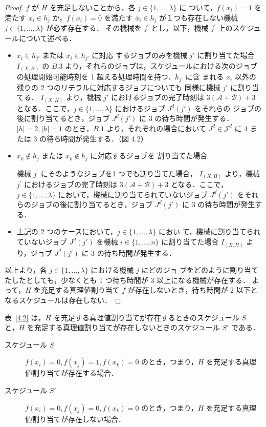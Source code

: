 \documentclass[12pt]{optlab-bachelor}
\begin{document}
\begin{proof}
  $f$ が $H$ を充足しないことから，各 $j \in \{1, \ldots, \lambda \}$ に
  ついて，$f(x_i) = 1$ を満たす $x_i \in h_j$ か，$f(x_i) = 0$ を満たす
  $\bar x_i \in h_j$ が１つも存在しない機械 $j \in \{1,\ldots, \lambda\}$ が必ず存在する．
  その機械を $j^{\prime}$ とし，以下，機械 $j^{\prime}$ 上のスケジュールについて述べる．
  \begin{itemize}
    \item $x_i \in h_{j'}$ または $\bar x_i \in h_{j'}$ に対応
    するジョブのみを機械 $j'$ に割り当てた場合
    $I_{(X,H)}$ の $B.3$ より，それらのジョブは，スケジュールにおける次のジョブの処理開始可能時刻を 1 超える処理時間を持つ．$h_{j'}$ に含
    まれる $x_i$ 以外の残りの 2 つのリテラルに対応するジョブについても
    同様に機械 $j'$ に割り当てる．
    $I_{(X,H)}$ より，機械 $j'$ におけるジョブの完了時刻は
    $3(\mathcal{A} + \mathcal{B}) + 3$ となる．ここで，$j \in
    \{1,\ldots,\lambda\}$ におけるジョブ $J^d(j')$ をそれらの
    ジョブの後に割り当てるとき，ジョブ $J^d(j')$ に 3 の待ち時間が発生する．$|h| = 2,|h| = 1$ のとき，$B.1$ より，それぞれの場合において $J^d \in \mathcal{J}^d$ に 4 または 3 の待ち時間が発生する．（図 4.2）
  \end{itemize}

  \begin{itemize}
    \item $x_k \notin h_j$ または $\bar x_k \notin h_j$ に対応するジョブを
    割り当てた場合

    機械 $j^{\prime}$ にそのようなジョブを1 つでも割り当てた場合，
    $I_{(X,H)}$ より，機械 $j^{\prime}$ におけるジョブの完了時刻は
    $3(\mathcal{A} + \mathcal{B}) + 3$ となる．ここで，$j \in
    \{1,\ldots,\lambda\}$ において，機械に割り当てられていないジョブ
    $J^d(j')$ をそれらのジョブの後に割り当てるとき，ジョブ
    $J^d(j')$ に 3 の待ち時間が発生する．
    \item 上記の 2 つのケースにおいて，$j \in \{1,\ldots,\lambda\}$ におい
    て，機械に割り当てられていないジョブ $J^d(j')$ を機械 $i
    \in \{1,\ldots,n\}$ に割り当てた場合 $I_{(X,H)}$ より，ジョブ
    $J^d(j')$ に 3 の待ち時間が発生する．
  \end{itemize}
  以上より，各 $j \in \{1,\ldots,\lambda\}$ における機械 $j$ にどのジョ
  ブをどのように割り当てたしたとしても，少なくとも 1 つ待ち時間が 3 以上になる機械が存在する．
  よって，$H$ を充足する真理値割り当て $f$ が存在しないとき，待ち時間が 2 以下となるスケジュールは存在しない．
\end{proof}
表~\ref{4.2} は，$H$ を充足する真理値割り当てが存在するときのスケジュール $S$ と，$H$ を充足する真理値割り当てが存在しないときのスケジュール $S'$ である．
\begin{description}
  \item[スケジュール $S$ ] $f(x_i) = 0, f(x_j) = 1, f(x_k) = 0$ のとき，つまり，$H$ を充足する真理値割り当てが存在する場合．
  \item[スケジュール $S'$ ] $f(x_i) = 0, f(x_j) = 0, f(x_k) = 0$ のとき，つまり，$H$ を充足する真理値割り当てが存在しない場合．
\end{description}
\end{document}
